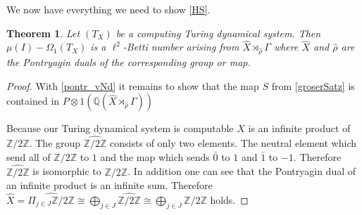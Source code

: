 \documentclass[12pt,a4paper]{scrartcl}
\theoremstyle{plain}
\newtheorem{Theorem}{Theorem}[section]
\theoremstyle{definition}
\numberwithin{equation}{section}
\newcommand{\Q}{\mathbb{Q}} %
\newcommand{\2}{\mathbb{Z} / 2 \mathbb{Z}}
\newcommand{\1}{\bar{1}}
\newcommand{\0}{\bar{0}}
\begin{document}
We now have everything we need to show \ref{HS}.
\begin{Theorem}\label{image_of_P}
	Let $(T_X)$ be a computing Turing dynamical system. Then $\mu (I) - \Omega_1(T_X)$ is a $\ell^2$-Betti number arising from $\hat{X} \rtimes_{\hat{\rho}} \Gamma$ where $\hat{X}$ and $\hat{\rho}$ are the Pontryagin duals of the corresponding group or map.
\end{Theorem}
\begin{proof}
	With \ref{pontr_vNd} it remains to show that the map $S$ from \ref{groserSatz} is contained in $P \otimes 1(\Q (\hat{X} \rtimes_{\hat{\rho}} \Gamma))$
	
	Because our Turing dynamical system is computable $X$ is an infinite product of $\2$. The group $\hat{\2}$ consists of only two elements. The neutral element which send all of $\2$ to $1$ and the map which sends $\0$ to $1$ and $\1$ to $-1$. Therefore $\hat{\2}$ is isomorphic to $\2$. In addition one can see  that the Pontryagin dual of an infinite product is an infinite sum. Therefore $\hat{X} = \hat{\Pi_{j \in J} \2} \cong \bigoplus_{j \in J} \hat{\2} \cong \bigoplus_{j \in J} \2$ holds.
		

\end{proof}
\end{document}
